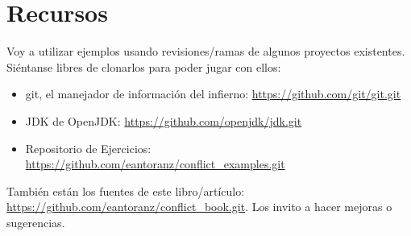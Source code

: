 
\section{Recursos}

Voy a utilizar ejemplos usando revisiones/ramas de algunos proyectos existentes. Siéntanse libres de clonarlos
para poder jugar con ellos:

\begin{itemize}

	\item git, el manejador de información del infierno: \url{https://github.com/git/git.git}
	\label{git_repo}

	\item JDK de OpenJDK: \url{https://github.com/openjdk/jdk.git}
	\label{openjdk_repo}
	
	\item Repositorio de Ejercicios: \url{https://github.com/eantoranz/conflict_examples.git}
	\label{exercises_repo}

\end{itemize}

También están los fuentes de este libro/artículo: \url{https://github.com/eantoranz/conflict_book.git}.
Los invito a hacer mejoras o sugerencias.
